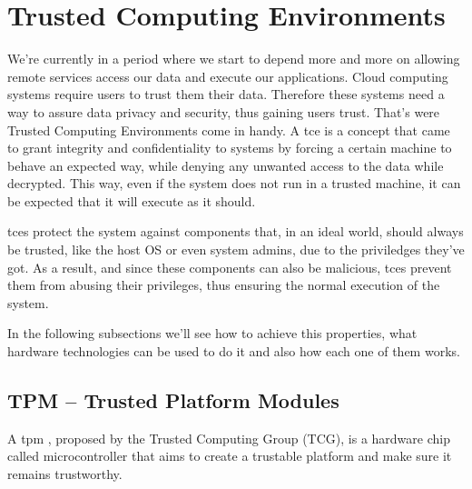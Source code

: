 




\section{Trusted Computing Environments} %
\label{sec:tce}
We're currently in a period where we start to depend more and more on allowing remote services access our data and execute our applications. Cloud computing systems require users to trust them their data. Therefore these systems need a way to assure data privacy and security, thus gaining users trust. That's were Trusted Computing Environments come in handy.
A \gls{tce} is a concept that came to grant integrity and confidentiality to systems by forcing a certain machine to behave an expected way, while denying any unwanted access to the data while decrypted. This way, even if the system does not run in a trusted machine, it can be expected that it will execute as it should. 

\gls{tce}s protect the system against components that, in an ideal world, should always be trusted, like the host OS or even system admins, due to the priviledges they've got. As a result, and since these components can also be malicious, \gls{tce}s prevent them from abusing their privileges, thus ensuring the normal execution of the system. 

In the following subsections we'll see how to achieve this properties, what hardware technologies can be used to do it and also how each one of them works.

\subsection{TPM – Trusted Platform Modules }
\label{ssec:tpm_intro}

A \gls{tpm} \cite{tpmPaper}, proposed by the Trusted Computing Group (TCG), is a hardware chip called microcontroller that aims to create a trustable platform and make sure it remains trustworthy.
 
